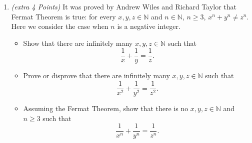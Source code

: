\documentclass[10pt]{article} %
\newcommand{\N}{\mathbb{N}}
\newcommand{\points}[1]{{\it (#1 Points)}}
\begin{document}
\begin{enumerate}
\begin{proof}
Let $a = b = 2$, then

$(2 - 2)^3 - 9(2 - 2) = 0$

$0 - 9(0) = 0$

This satisfies the hypothesis.  

\end{proof}

\begin{raggedright} {\bf Case 2:} $a = 1, b = 4$ \end{raggedright}

\begin{proof}
Let $a = 1$ and $b = 4$, then

$(1 - 4)^3 - 9(1 - 4) = 0$

$-27 - 9(-3) = 0$

This satisfies the hypothesis.  

\end{proof}

\begin{raggedright} {\bf Case 3:} $a = 4, b = 1$ \end{raggedright}

\begin{proof}
Let $a = 4$ and $b = 1$, then

$(4 - 1)^3 - 9(4 - 1) = 0$

$27 - 9(3) = 0$

This satisfies the hypothesis.  

\end{proof}

\begin{raggedright}  Therefore, it is proven that if $ab = 4$, then $(a-b)^3-9(a-b)=0$.  \end{raggedright}

\bigskip

\item \points{extra 4} It was proved by Andrew Wiles and Richard Taylor that Fermat Theorem is true: for every $x,y,z\in \N$ and $n\in \N$, $n\ge 3$, $x^n+y^n\ne z^n$. Here we consider the case when $n$ is a negative integer.
    \begin{itemize}
      \item Show that there are infinitely many $x,y,z\in \N$ such that $$\frac{1}{x}+\frac{1}{y}=\frac{1}{z}.$$
      \item Prove or disprove that there are infinitely many $x,y,z\in \N$ such that $$\frac{1}{x^2}+\frac{1}{y^2}=\frac{1}{z^2}.$$
      \item Assuming the Fermat Theorem, show that there is no $x,y,z\in \N$ and $n\ge 3$ such that $$\frac{1}{x^n}+\frac{1}{y^n}=\frac{1}{z^n}.$$
    \end{itemize}








\end{enumerate}
\end{document}
